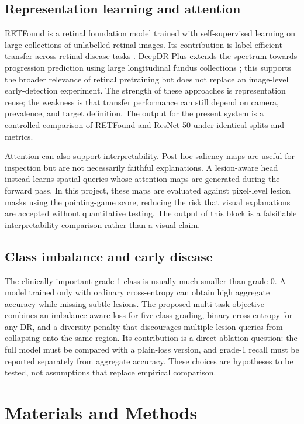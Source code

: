 \documentclass[11pt,a4paper]{article}
\begin{document}
\subsection{Representation learning and attention}
RETFound is a retinal foundation model trained with self-supervised learning on large collections of unlabelled retinal images. Its contribution is label-efficient transfer across retinal disease tasks \cite{zhou2023}. DeepDR Plus extends the spectrum towards progression prediction using large longitudinal fundus collections \cite{deepdrplus2024}; this supports the broader relevance of retinal pretraining but does not replace an image-level early-detection experiment. The strength of these approaches is representation reuse; the weakness is that transfer performance can still depend on camera, prevalence, and target definition. The output for the present system is a controlled comparison of RETFound and ResNet-50 under identical splits and metrics.

Attention can also support interpretability. Post-hoc saliency maps are useful for inspection but are not necessarily faithful explanations. A lesion-aware head instead learns spatial queries whose attention maps are generated during the forward pass. In this project, these maps are evaluated against pixel-level lesion masks using the pointing-game score, reducing the risk that visual explanations are accepted without quantitative testing. The output of this block is a falsifiable interpretability comparison rather than a visual claim.

\subsection{Class imbalance and early disease}
The clinically important grade-1 class is usually much smaller than grade 0. A model trained only with ordinary cross-entropy can obtain high aggregate accuracy while missing subtle lesions. The proposed multi-task objective combines an imbalance-aware loss for five-class grading, binary cross-entropy for any DR, and a diversity penalty that discourages multiple lesion queries from collapsing onto the same region. Its contribution is a direct ablation question: the full model must be compared with a plain-loss version, and grade-1 recall must be reported separately from aggregate accuracy. These choices are hypotheses to be tested, not assumptions that replace empirical comparison.

\section{Materials and Methods}
\end{document}
